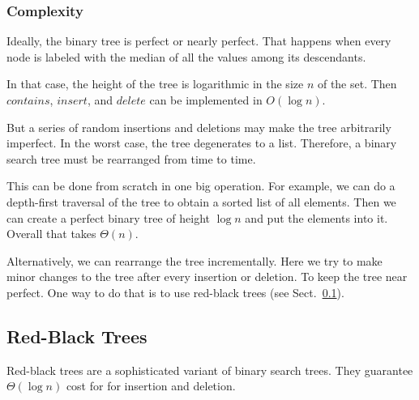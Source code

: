 \subsubsection{Complexity}

Ideally, the binary tree is perfect or nearly perfect.
That happens when every node is labeled with the median of all the values among its descendants.

In that case, the height of the tree is logarithmic in the size $n$ of the set.
Then $contains$, $insert$, and $delete$ can be implemented in $O(\log n)$.
\medskip

But a series of random insertions and deletions may make the tree arbitrarily imperfect.
In the worst case, the tree degenerates to a list.
Therefore, a binary search tree must be rearranged from time to time.

This can be done from scratch in one big operation.
For example, we can do a depth-first traversal of the tree to obtain a sorted list of all elements.
Then we can create a perfect binary tree of height $\log n$ and put the elements into it.
Overall that takes $\Theta(n)$.

Alternatively, we can rearrange the tree incrementally.
Here we try to make minor changes to the tree after every insertion or deletion.
To keep the tree near perfect.
One way to do that is to use red-black trees (see Sect.~\ref{sec:ad:redblacktree}).

\subsection{Red-Black Trees}\label{sec:ad:redblacktree}

Red-black trees are a sophisticated variant of binary search trees.
They guarantee $\Theta(\log n)$ cost for for insertion and deletion.
